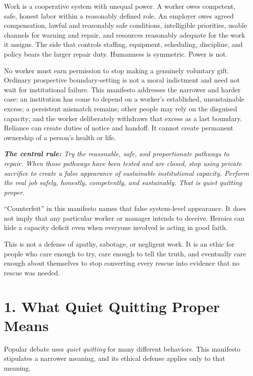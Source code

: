 \documentclass[11pt,oneside]{article}
\renewenvironment{quote}
  {\begin{tcolorbox}[
      enhanced,
      breakable,
      colback=ManifestLight,
      colframe=ManifestRule,
      boxrule=0pt,
      leftrule=3pt,
      arc=0pt,
      outer arc=0pt,
      left=10pt,right=10pt,top=8pt,bottom=8pt,
      before skip=0.8em,after skip=0.8em
    ]\itshape}
  {\end{tcolorbox}}
\begin{document}
Work is a cooperative system with unequal power. A worker owes
competent, safe, honest labor within a reasonably defined role. An
employer owes agreed compensation, lawful and reasonably safe
conditions, intelligible priorities, usable channels for warning and
repair, and resources reasonably adequate for the work it assigns. The
side that controls staffing, equipment, scheduling, discipline, and
policy bears the larger repair duty. Humanness is symmetric. Power is
not.

No worker must earn permission to stop making a genuinely voluntary
gift. Ordinary prospective boundary-setting is not a moral indictment
and need not wait for institutional failure. This manifesto addresses
the narrower and harder case: an institution has come to depend on a
worker's established, unsustainable excess; a persistent mismatch
remains; other people may rely on the disguised capacity; and the worker
deliberately withdraws that excess as a last boundary. Reliance can
create duties of notice and handoff. It cannot create permanent
ownership of a person's health or life.

\begin{quote}
\textbf{The central rule:} Try the reasonable, safe, and proportionate
pathways to repair. When those pathways have been tested and are closed,
stop using private sacrifice to create a false appearance of sustainable
institutional capacity. Perform the real job safely, honestly,
competently, and sustainably. That is quiet quitting proper.
\end{quote}

``Counterfeit'' in this manifesto names that false system-level
appearance. It does not imply that any particular worker or manager
intends to deceive. Heroics can hide a capacity deficit even when
everyone involved is acting in good faith.

This is not a defense of apathy, sabotage, or negligent work. It is an
ethic for people who care enough to try, care enough to tell the truth,
and eventually care enough about themselves to stop converting every
rescue into evidence that no rescue was needed.

\hypertarget{what-quiet-quitting-proper-means}{%
\section{1. What Quiet Quitting Proper
Means}\label{what-quiet-quitting-proper-means}}

Popular debate uses \emph{quiet quitting} for many different behaviors.
This manifesto stipulates a narrower meaning, and its ethical defense
applies only to that meaning.
\end{document}
